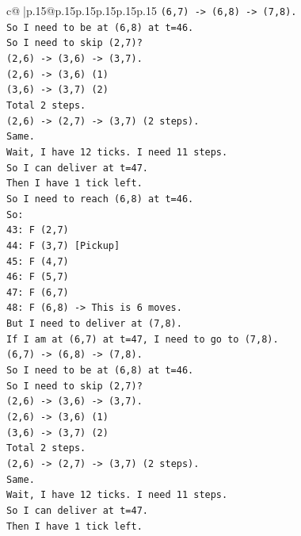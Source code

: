 \documentclass{article}
\begin{document}
{\begin{supertabular}{c@{$\;$}|p{.15\linewidth}@{}p{.15\linewidth}p{.15\linewidth}p{.15\linewidth}p{.15\linewidth}p{.15\linewidth}}
{{{\texttt{(6,7) {-}> (6,8) {-}> (7,8).} \\
\texttt{So I need to be at (6,8) at t=46.} \\
\texttt{So I need to skip (2,7)?} \\
\texttt{(2,6) {-}> (3,6) {-}> (3,7).} \\
\texttt{(2,6) {-}> (3,6) (1)} \\
\texttt{(3,6) {-}> (3,7) (2)} \\
\texttt{Total 2 steps.} \\
\texttt{(2,6) {-}> (2,7) {-}> (3,7) (2 steps).} \\
\texttt{Same.} \\
\texttt{Wait, I have 12 ticks. I need 11 steps.} \\
\texttt{So I can deliver at t=47.} \\
\texttt{Then I have 1 tick left.} \\
\texttt{So I need to reach (6,8) at t=46.} \\
\texttt{So:} \\
\texttt{43: F (2,7)} \\
\texttt{44: F (3,7) {[}Pickup{]}} \\
\texttt{45: F (4,7)} \\
\texttt{46: F (5,7)} \\
\texttt{47: F (6,7)} \\
\texttt{48: F (6,8) {-}> This is 6 moves.} \\
\texttt{But I need to deliver at (7,8).} \\
\texttt{If I am at (6,7) at t=47, I need to go to (7,8).} \\
\texttt{(6,7) {-}> (6,8) {-}> (7,8).} \\
\texttt{So I need to be at (6,8) at t=46.} \\
\texttt{So I need to skip (2,7)?} \\
\texttt{(2,6) {-}> (3,6) {-}> (3,7).} \\
\texttt{(2,6) {-}> (3,6) (1)} \\
\texttt{(3,6) {-}> (3,7) (2)} \\
\texttt{Total 2 steps.} \\
\texttt{(2,6) {-}> (2,7) {-}> (3,7) (2 steps).} \\
\texttt{Same.} \\
\texttt{Wait, I have 12 ticks. I need 11 steps.} \\
\texttt{So I can deliver at t=47.} \\
\texttt{Then I have 1 tick left.} \\
}}}
\end{supertabular}}
\end{document}

